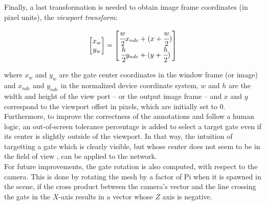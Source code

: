 Finally, a last transformation is needed to obtain image frame coordinates (in
pixel units), the \emph{viewport transform}:

\begin{equation}
	\begin{bmatrix}
		x_w\\y_w
	\end{bmatrix}
	=
	\begin{bmatrix}
		\cfrac{w}{2} x_{ndc} + (x + \cfrac{w}{2})\\
		\cfrac{h}{2} y_{ndc} + (y + \cfrac{h}{2})\\
	\end{bmatrix}
\end{equation}

where $x_w$ and $y_w$ are the gate center coordinates in the window
frame (or image) and $x_{ndc}$ and $y_{ndc}$ in the normalized device
coordinate system, $w$ and $h$ are the width and height of the view port -- or
the output image frame -- and $x$ and $y$ correspond to the viewport offset in
pixels, which are initially set to 0.\\

Furthermore, to improve the correctness of the annotations and follow a human
logic, an out-of-screen tolerance percentage is added to select a target gate
even if its center is slightly outside of the viewport. In that way, the
intuition of targetting a gate which is clearly visible, but whose center does
not seem to be in the field of view , can be applied to the network.\\

For future improvements, the gate rotation is also computed, with respect to
the camera. This is done by rotating the mesh by a factor of Pi when it is
spawned in the scene, if the cross product between the camera's vector and the
line crossing the gate in the $X$-axis results in a vector whose $Z$ axis is
negative.
